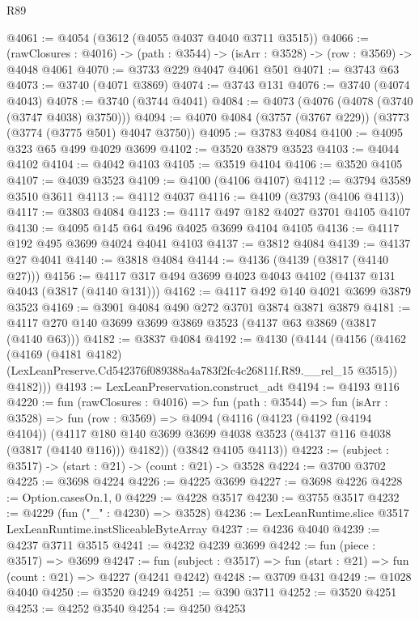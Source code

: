 \begin{lexlean}{R89}
\begin{coremodule}
@4061 := @4054 (@3612 (@4055 @4037 @4040 @3711 @3515))
@4066 := (rawClosures : @4016) -> (path : @3544) -> (isArr : @3528) -> (row : @3569) -> @4048 @4061
@4070 := @3733 @229 @4047 @4061 @501
@4071 := @3743 @63
@4073 := @3740 (@4071 @3869)
@4074 := @3743 @131
@4076 := @3740 (@4074 @4043)
@4078 := @3740 (@3744 @4041)
@4084 := @4073 (@4076 (@4078 (@3740 (@3747 @4038) @3750)))
@4094 := @4070 @4084 (@3757 (@3767 @229)) (@3773 (@3774 (@3775 @501) @4047 @3750))
@4095 := @3783 @4084
@4100 := @4095 @323 @65 @499 @4029 @3699
@4102 := @3520 @3879 @3523
@4103 := @4044 @4102
@4104 := @4042 @4103
@4105 := @3519 @4104
@4106 := @3520 @4105
@4107 := @4039 @3523
@4109 := @4100 (@4106 @4107)
@4112 := @3794 @3589 @3510 @3611
@4113 := @4112 @4037
@4116 := @4109 (@3793 (@4106 @4113))
@4117 := @3803 @4084
@4123 := @4117 @497 @182 @4027 @3701 @4105 @4107
@4130 := @4095 @145 @64 @496 @4025 @3699 @4104 @4105
@4136 := @4117 @192 @495 @3699 @4024 @4041 @4103
@4137 := @3812 @4084
@4139 := @4137 @27 @4041
@4140 := @3818 @4084
@4144 := @4136 (@4139 (@3817 (@4140 @27)))
@4156 := @4117 @317 @494 @3699 @4023 @4043 @4102 (@4137 @131 @4043 (@3817 (@4140 @131)))
@4162 := @4117 @492 @140 @4021 @3699 @3879 @3523
@4169 := @3901 @4084 @490 @272 @3701 @3874 @3871 @3879
@4181 := @4117 @270 @140 @3699 @3699 @3869 @3523 (@4137 @63 @3869 (@3817 (@4140 @63)))
@4182 := @3837 @4084
@4192 := @4130
    (@4144
      (@4156
        (@4162
          (@4169
            (@4181 @4182)
            (LexLeanPreserve.Cd542376f089388a4a783f2fc4c26811f.R89.__rel_15 @3515))
          @4182)))
@4193 := LexLeanPreservation.construct_adt
@4194 := @4193 @116
@4220 := fun (rawClosures : @4016) =>
  fun (path : @3544) =>
  fun (isArr : @3528) =>
  fun (row : @3569) =>
  @4094
    (@4116
      (@4123
        (@4192 (@4194 @4104))
        (@4117 @180 @140 @3699 @3699 @4038 @3523 (@4137 @116 @4038 (@3817 (@4140 @116))) @4182))
      (@3842 @4105 @4113))
@4223 := (subject : @3517) -> (start : @21) -> (count : @21) -> @3528
@4224 := @3700 @3702
@4225 := @3698 @4224
@4226 := @4225 @3699
@4227 := @3698 @4226
@4228 := Option.casesOn.{1, 0}
@4229 := @4228 @3517
@4230 := @3755 @3517
@4232 := @4229 (fun ("_" : @4230) => @3528)
@4236 := LexLeanRuntime.slice @3517 LexLeanRuntime.instSliceableByteArray
@4237 := @4236 @4040
@4239 := @4237 @3711 @3515
@4241 := @4232 @4239 @3699
@4242 := fun (piece : @3517) => @3699
@4247 := fun (subject : @3517) => fun (start : @21) => fun (count : @21) => @4227 (@4241 @4242)
@4248 := @3709 @431
@4249 := @1028 @4040
@4250 := @3520 @4249
@4251 := @390 @3711
@4252 := @3520 @4251
@4253 := @4252 @3540
@4254 := @4250 @4253

\end{coremodule}
\end{lexlean}

